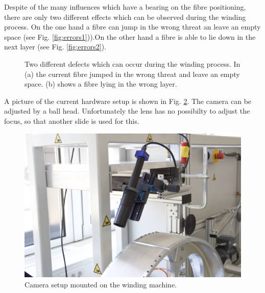 Despite of the many influences which have a bearing on the fibre positioning, there are only two different effects which can be observed during the winding process. On the one hand a fibre can jump in the wrong threat an leave an empty space (see Fig. \ref{fig:errors1})).On the other hand a fibre is able to lie down in the next layer (see Fig. \ref{fig:errors2}).
\begin{figure}[ht]
\centering
{}
\quad
\label{errors}
\caption{Two different defects which can occur during the winding process. In (a) the current fibre jumped in the wrong threat and leave an empty space. (b) shows a fibre lying in the wrong layer.}
\end{figure}

A picture of the current hardware setup is shown in Fig. \ref{CameraOnMaschine}. The camera can be adjusted by a ball head. Unfortunately the lens has no possibilty to adjust the focus, so that another slide is used for this.
\begin{figure}[tb]
\begin{center}
\includegraphics[width=0.5\linewidth]{figs/camera.jpeg}%
\caption{Camera setup mounted on the winding machine.\label{CameraOnMaschine}}
\end{center}
\end{figure}